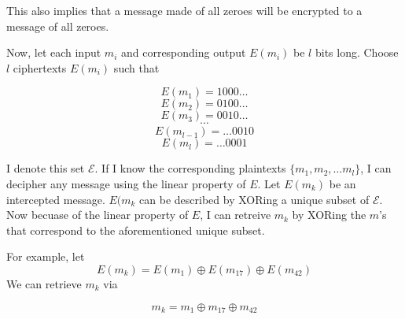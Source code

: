 \documentclass[a4paper,10pt]{article}
\begin{document}
This also implies that a message made of all zeroes will be encrypted to a message of all zeroes.

Now, let each input $m_{i}$ and corresponding output $E(m_{i})$ be $l$ bits long.  Choose $l$ ciphertexts $E(m_{i})$ such that

$$E(m_{1}) = 1000\dots$$
$$E(m_{2}) = 0100\dots$$
$$E(m_{3}) = 0010\dots$$
$$\cdots{}$$
$$E(m_{l-1}) = \dots0010$$
$$E(m_{l}) = \dots0001$$

I denote this set $\mathscr{E}$. If I know the corresponding plaintexts $\{m_{1}, m_{2}, \dots m_{l}  \}$, I can decipher any message using the linear property of $E$. Let $E(m_{k})$ be an intercepted message. $E(m_{k}$ can be described by XORing a unique subset of  $\mathscr{E}$.  Now becuase of the linear property of $E$, I can retreive $m_{k}$ by XORing the $m$'s that correspond to the aforementioned unique subset.  

For example, let $$E(m_{k}) = E(m_{1}) \oplus E(m_{17}) \oplus E(m_{42}) $$ 
We can retrieve $m_{k}$ via

$$m_{k} = m_{1} \oplus m_{17} \oplus m_{42} $$
\end{document}
